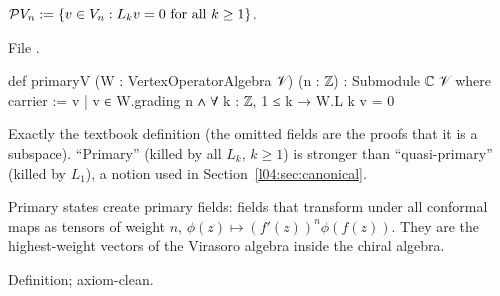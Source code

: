 \begin{definition}\label{l04:def:primary}
$\mathcal PV_n := \{v\in V_n : L_kv = 0\text{ for all }k\ge1\}$.
\end{definition}
\noindent File .
\begin{leancode}
def primaryV (W : VertexOperatorAlgebra 𝒱) (n : ℤ) : Submodule ℂ 𝒱 where
  carrier := {v | v ∈ W.grading n ∧ ∀ k : ℤ, 1 ≤ k → W.L k v = 0}
\end{leancode}
\begin{dictionary}
Exactly the textbook definition (the omitted fields are the proofs that it is a subspace).
``Primary'' (killed by all $L_k$, $k\ge1$) is stronger than ``quasi-primary'' (killed by $L_1$),
a notion used in Section~\ref{l04:sec:canonical}.
\end{dictionary}
\begin{physics}
Primary states create primary fields: fields that transform under all conformal maps as tensors of
weight $n$, $\phi(z)\mapsto (f'(z))^n\phi(f(z))$. They are the highest-weight vectors of the Virasoro
algebra inside the chiral algebra.
\end{physics}
\begin{status}
Definition; axiom-clean.
\end{status}

